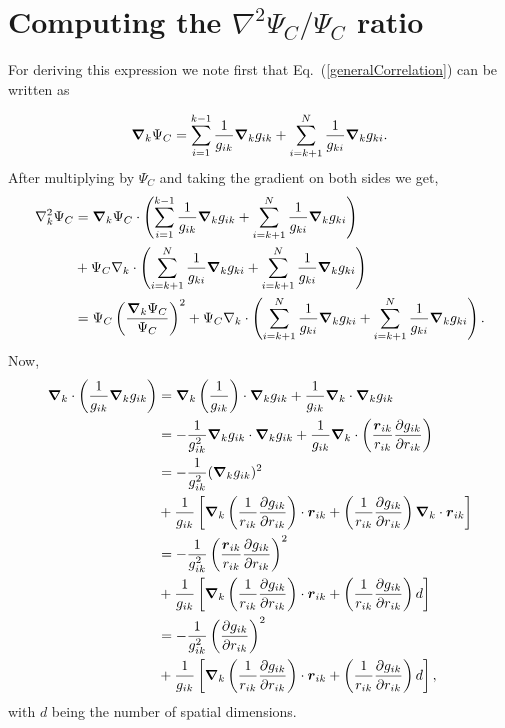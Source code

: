 \section{Computing the $\nabla^2 \Psi_C/\Psi_C$ ratio}\label{lapCorOpt}

For deriving this expression we note first that Eq.~(\ref{generalCorrelation}) can be written as 

$$\boldsymbol{\nabla}_k \Psi_C = 
\sum_{i=1}^{k-1}\frac{1}{g_{ik}} \boldsymbol{\nabla}_k g_{ik}
+
\sum_{i=k+1}^{N}\frac{1}{g_{ki}}\boldsymbol{\nabla}_k g_{ki}.$$
After multiplying by $\Psi_C$ and taking the gradient on both sides we get,
\begin{align}\label{gradLap}
\nabla_{k}^2 \Psi_C & = \boldsymbol{\nabla}_k \Psi_C \cdot 
\left(\sum_{i=1}^{k-1}\frac{1}{g_{ik}} \boldsymbol{\nabla}_k g_{ik}
+
\sum_{i=k+1}^{N}\frac{1}{g_{ki}}\boldsymbol{\nabla}_k g_{ki}\right)\nonumber\\
&+
\Psi_C \nabla_k \cdot \left(\sum_{i=k+1}^{N}\frac{1}{g_{ki}}\boldsymbol{\nabla}_k g_{ki}
+
\sum_{i=k+1}^{N}\frac{1}{g_{ki}}\boldsymbol{\nabla}_k g_{ki}\right)\nonumber\\
& = \Psi_C \left(\frac{\boldsymbol{\nabla}_k \Psi_C}{\Psi_C}\right)^2 +
\Psi_C \nabla_k \cdot \left(\sum_{i=k+1}^{N}\frac{1}{g_{ki}}\boldsymbol{\nabla}_k g_{ki}
+
\sum_{i=k+1}^{N}\frac{1}{g_{ki}}\boldsymbol{\nabla}_k g_{ki}\right).
\end{align}
Now,
\begin{align}
 \boldsymbol{\nabla}_k \cdot \left(\frac{1}{g_{ik}}\boldsymbol{\nabla}_k g_{ik}\right) &= \boldsymbol{\nabla}_k \left(\frac{1}{g_{ik}}\right)\cdot \boldsymbol{\nabla}_k g_{ik} + \frac{1}{g_{ik}}\boldsymbol{\nabla}_k \cdot \boldsymbol{\nabla}_k g_{ik}\nonumber\\
 & = -\frac{1}{g_{ik}^2} \boldsymbol{\nabla}_k g_{ik} \cdot \boldsymbol{\nabla}_k g_{ik} + \frac{1}{g_{ik}} \boldsymbol{\nabla}_k \cdot \left(\frac{\boldsymbol{r}_{ik}}{r_{ik}}\frac{\partial g_{ik}}{\partial r_{ik}}\right)\nonumber\\
 & = -\frac{1}{g_{ik}^2} (\boldsymbol{\nabla}_k g_{ik})^2 \nonumber\\&+ \frac{1}{g_{ik}}\left[\boldsymbol{\nabla}_k \left(\frac{1}{r_{ik}}\frac{\partial g_{ik}}{\partial r_{ik}}\right)\cdot \boldsymbol{r}_{ik} + \left(\frac{1}{r_{ik}}\frac{\partial g_{ik}}{\partial r_{ik}}\right) \boldsymbol{\nabla}_k \cdot \boldsymbol{r}_{ik}  \right] \nonumber\\
 &= -\frac{1}{g_{ik}^2} \left(\frac{\boldsymbol{r}_{ik}}{r_{ik}}\frac{\partial g_{ik}}{\partial r_{ik}}\right)^2\nonumber\\ &+ \frac{1}{g_{ik}}\left[\boldsymbol{\nabla}_k \left(\frac{1}{r_{ik}}\frac{\partial g_{ik}}{\partial r_{ik}}\right)\cdot \boldsymbol{r}_{ik} + \left(\frac{1}{r_{ik}}\frac{\partial g_{ik}}{\partial r_{ik}}\right) d  \right]\nonumber\\
 &= -\frac{1}{g_{ik}^2} \left(\frac{\partial g_{ik}}{\partial r_{ik}}\right)^2\nonumber\\ &+ \frac{1}{g_{ik}}\left[\boldsymbol{\nabla}_k \left(\frac{1}{r_{ik}}\frac{\partial g_{ik}}{\partial r_{ik}}\right)\cdot \boldsymbol{r}_{ik} + \left(\frac{1}{r_{ik}}\frac{\partial g_{ik}}{\partial r_{ik}}\right) d  \right], \label{subs0}
 \end{align}
with $d$ being the number of spatial dimensions.

